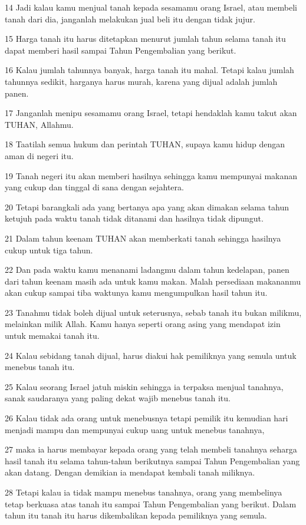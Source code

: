 \par 14 Jadi kalau kamu menjual tanah kepada sesamamu orang Israel, atau membeli tanah dari dia, janganlah melakukan jual beli itu dengan tidak jujur.
\par 15 Harga tanah itu harus ditetapkan menurut jumlah tahun selama tanah itu dapat memberi hasil sampai Tahun Pengembalian yang berikut.
\par 16 Kalau jumlah tahunnya banyak, harga tanah itu mahal. Tetapi kalau jumlah tahunnya sedikit, harganya harus murah, karena yang dijual adalah jumlah panen.
\par 17 Janganlah menipu sesamamu orang Israel, tetapi hendaklah kamu takut akan TUHAN, Allahmu.
\par 18 Taatilah semua hukum dan perintah TUHAN, supaya kamu hidup dengan aman di negeri itu.
\par 19 Tanah negeri itu akan memberi hasilnya sehingga kamu mempunyai makanan yang cukup dan tinggal di sana dengan sejahtera.
\par 20 Tetapi barangkali ada yang bertanya apa yang akan dimakan selama tahun ketujuh pada waktu tanah tidak ditanami dan hasilnya tidak dipungut.
\par 21 Dalam tahun keenam TUHAN akan memberkati tanah sehingga hasilnya cukup untuk tiga tahun.
\par 22 Dan pada waktu kamu menanami ladangmu dalam tahun kedelapan, panen dari tahun keenam masih ada untuk kamu makan. Malah persediaan makananmu akan cukup sampai tiba waktunya kamu mengumpulkan hasil tahun itu.
\par 23 Tanahmu tidak boleh dijual untuk seterusnya, sebab tanah itu bukan milikmu, melainkan milik Allah. Kamu hanya seperti orang asing yang mendapat izin untuk memakai tanah itu.
\par 24 Kalau sebidang tanah dijual, harus diakui hak pemiliknya yang semula untuk menebus tanah itu.
\par 25 Kalau seorang Israel jatuh miskin sehingga ia terpaksa menjual tanahnya, sanak saudaranya yang paling dekat wajib menebus tanah itu.
\par 26 Kalau tidak ada orang untuk menebusnya tetapi pemilik itu kemudian hari menjadi mampu dan mempunyai cukup uang untuk menebus tanahnya,
\par 27 maka ia harus membayar kepada orang yang telah membeli tanahnya seharga hasil tanah itu selama tahun-tahun berikutnya sampai Tahun Pengembalian yang akan datang. Dengan demikian ia mendapat kembali tanah miliknya.
\par 28 Tetapi kalau ia tidak mampu menebus tanahnya, orang yang membelinya tetap berkuasa atas tanah itu sampai Tahun Pengembalian yang berikut. Dalam tahun itu tanah itu harus dikembalikan kepada pemiliknya yang semula.
